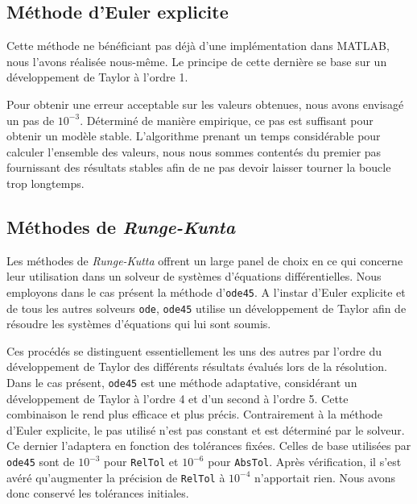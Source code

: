 \documentclass[a4paper, 12pt]{article}
\begin{document}
	\subsection{Méthode d’Euler explicite}
	Cette méthode ne bénéficiant pas déjà d’une implémentation dans \textsc{MATLAB}, nous l’avons réalisée nous-même. Le principe de cette dernière se base sur un développement de Taylor à l’ordre 1.\par
	Pour obtenir une erreur acceptable sur les valeurs obtenues, nous avons envisagé un pas de $10^{-3}$. Déterminé de manière empirique, ce pas est suffisant pour obtenir un modèle stable. L'algorithme prenant un temps considérable pour calculer l'ensemble des valeurs, nous nous sommes contentés du premier pas fournissant des résultats stables afin de ne pas devoir laisser tourner la boucle trop longtemps.
	\subsection{Méthodes de \textit{Runge-Kunta}}
	Les méthodes de \textit{Runge-Kutta} offrent un large panel de choix en ce qui concerne leur utilisation dans un solveur de systèmes d’équations différentielles. Nous employons dans le cas présent la méthode d’\texttt{ode45}. A l’instar d'Euler explicite et de tous les autres solveurs \texttt{ode}, \texttt{ode45} utilise un développement de Taylor afin de résoudre les systèmes d'équations qui lui sont soumis.\par
	Ces procédés se distinguent essentiellement les uns des autres par l’ordre du développement de Taylor des différents résultats évalués lors de la résolution. Dans le cas présent, \texttt{ode45} est une méthode adaptative, considérant un développement de Taylor à l’ordre 4 et d’un second à l’ordre 5. Cette combinaison le rend plus efficace et plus précis. Contrairement à la méthode d’Euler explicite, le pas utilisé n'est pas constant et est déterminé par le solveur. Ce dernier l’adaptera en fonction des tolérances fixées. Celles de base utilisées par \texttt{ode45} sont de $10^{-3}$ pour \texttt{RelTol} et $10^{-6}$ pour \texttt{AbsTol}. Après vérification, il s'est avéré qu'augmenter la précision de \texttt{RelTol} à $10^{-4}$ n'apportait rien. Nous avons donc conservé les tolérances initiales.
\end{document}
